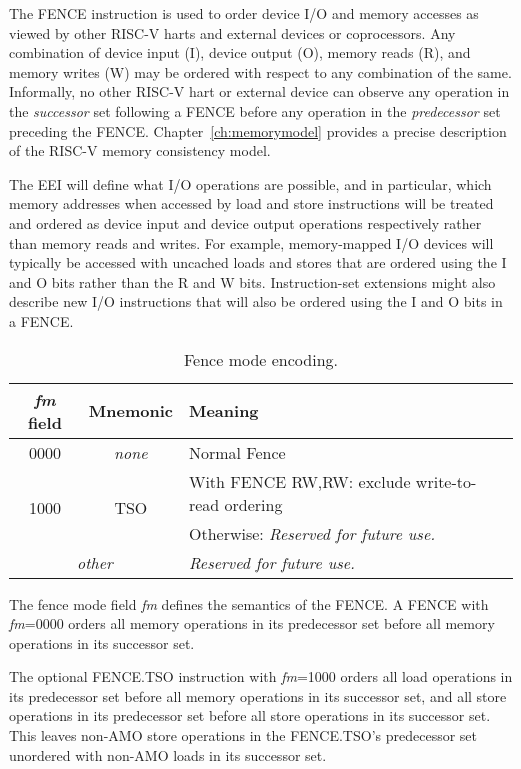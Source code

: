 The FENCE instruction is used to order device I/O and
memory accesses as viewed by other RISC-V harts and external devices
or coprocessors.  Any combination of device input (I), device output
(O), memory reads (R), and memory writes (W) may be ordered with
respect to any combination of the same.  Informally, no other RISC-V
hart or external device can observe any operation in the {\em
  successor} set following a FENCE before any operation in the {\em
  predecessor} set preceding the FENCE.
Chapter~\ref{ch:memorymodel} provides a precise description of the
RISC-V memory consistency model.
  
The EEI will define what I/O operations are possible, and in
particular, which memory addresses when accessed by load and store instructions will be treated and
ordered as device input and device output operations respectively
rather than memory reads and writes.  For example, memory-mapped I/O
devices will typically be accessed with uncached loads and stores that
are ordered using the I and O bits rather than the R and W bits.
Instruction-set extensions might also describe new I/O
instructions that will also be ordered using the I and O bits in a
FENCE.

\begin{table}[htp]
\begin{small}
\begin{center}
\begin{tabular}{|c|c|l|}
\hline
{\em fm} field & Mnemonic & Meaning \\
\hline
0000 & \em none & Normal Fence \\
\hline
\multirow{2}{*}{1000} & \multirow{2}{*}{TSO} & With FENCE RW,RW: exclude write-to-read ordering \\
                      &                      & Otherwise: \em Reserved for future use. \\
\hline
\multicolumn{2}{|c|}{\em other} & \em Reserved for future use. \\
\hline
\end{tabular}
\end{center}
\end{small}
\caption{Fence mode encoding.}
\label{fm}
\end{table}

The fence mode field {\em fm} defines the semantics of the FENCE.  A
FENCE with {\em fm}=0000 orders all memory operations in its
predecessor set before all memory operations in its successor set.

The optional FENCE.TSO instruction with {\em fm}=1000 orders all load
operations in its predecessor set before all memory operations in its
successor set, and all store operations in its predecessor set before
all store operations in its successor set.  This leaves non-AMO store
operations in the FENCE.TSO's predecessor set unordered with non-AMO
loads in its successor set.

